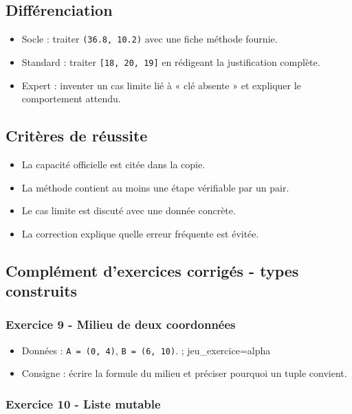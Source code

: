 \subsection{Différenciation}

\begin{itemize}
\tightlist
\item
  Socle : traiter \texttt{(36.8,\ 10.2)} avec une fiche méthode fournie.
\item
  Standard : traiter \texttt{{[}18,\ 20,\ 19{]}} en rédigeant la
  justification complète.
\item
  Expert : inventer un cas limite lié à « clé absente » et expliquer le
  comportement attendu.
\end{itemize}

\subsection{Critères de réussite}

\begin{itemize}
\tightlist
\item
  La capacité officielle est citée dans la copie.
\item
  La méthode contient au moins une étape vérifiable par un pair.
\item
  Le cas limite est discuté avec une donnée concrète.
\item
  La correction explique quelle erreur fréquente est évitée.
\end{itemize}

\subsection{Complément d’exercices corrigés - types construits}

\subsubsection{Exercice 9 - Milieu de deux coordonnées}

\begin{itemize}
\tightlist
\item
  Données : \texttt{A\ =\ (0,\ 4)}, \texttt{B\ =\ (6,\ 10)}. ;
  jeu\_exercice=alpha
\item
  Consigne : écrire la formule du milieu et préciser pourquoi un tuple
  convient.
\end{itemize}

\subsubsection{Exercice 10 - Liste mutable}

